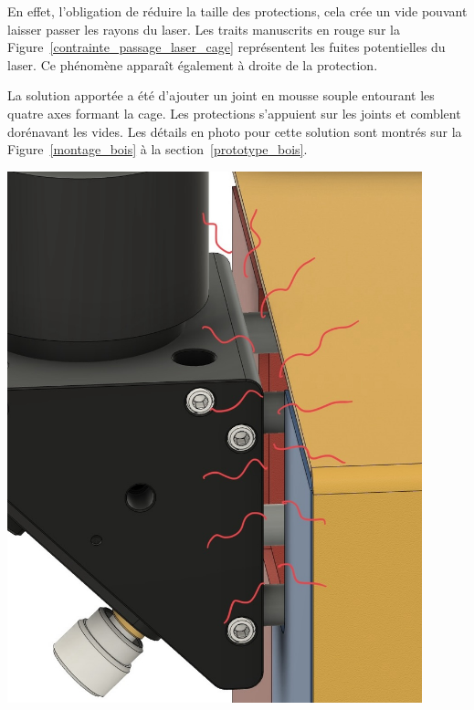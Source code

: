 \begin{minipage}[c]{0.5\textwidth}
    En effet, l'obligation de réduire la taille des protections, cela crée un vide pouvant laisser passer les rayons du laser. Les traits manuscrits en rouge sur la Figure~\ref{contrainte_passage_laser_cage} représentent les fuites potentielles du laser. Ce phénomène apparaît également à droite de la protection.

    La solution apportée a été d'ajouter un joint en mousse souple entourant les quatre axes formant la cage. Les protections s'appuient sur les joints et comblent dorénavant les vides. Les détails en photo pour cette solution sont montrés sur la Figure~\ref{montage_bois} à la section~\ref{prototype_bois}.
\end{minipage}\hfill
\begin{minipage}[c]{0.48\textwidth}
    \begin{center}
        \includegraphics[width=0.9\textwidth]{assets/figures/Protections_laser/Securite_mecanique/Protection_entree_laser/contrainte_passage_laser_cage.jpeg}
    \end{center}
    \label{contrainte_passage_laser_cage}
\end{minipage}

